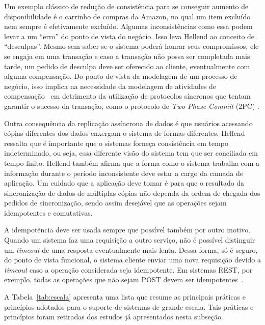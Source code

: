 Um exemplo clássico de redução de consistência para se conseguir aumento de disponibilidade é o carrinho de compras da Amazon, no qual um item excluído nem sempre é efetivamente excluído. Algumas inconsistências como essa podem levar a um ``erro'' do ponto de vista do negócio. Isso leva Hellend ao conceito de ``desculpas''. Mesmo sem saber se o sistema poderá honrar seus compromissos, ele se engaja em uma transação e caso a transação não possa ser completada mais tarde, um pedido de desculpa deve ser oferecido ao cliente, eventualmente com alguma compensação. Do ponto de vista da modelagem de um processo de negócio, isso implica na necessidade da modelagem de atividades de compensação~\cite{Garcia1991Saga} em detrimento da utilização de protocolos síncronos que tentam garantir o sucesso da transação, como o protocolo de \textit{Two Phase Commit} (2PC) \cite{Bernstein20092PC}.

Outra consequência da replicação assíncrona de dados é que usuários acessando cópias diferentes dos dados enxergam o sistema de formas diferentes. Hellend ressalta que é importante que o sistemas forneça consistência em tempo indeterminado, ou seja, essa diferente visão do sistema tem que ser conciliada em tempo finito. Hellend também afirma que a forma como o sistema trabalha com a informação durante o período inconsistente deve estar a cargo da camada de aplicação. Um cuidado que a aplicação deve tomar é para que o resultado da sincronização de dados de múltiplas cópias não dependa da ordem de chegada dos pedidos de sincronização, sendo assim desejável que as operações sejam idempotentes e comutativas. 

A idempotência deve ser usada sempre que possível também por outro motivo. Quando um sistema faz uma requisição a outro serviço, não é possível distinguir um \emph{timeout} de uma resposta eventualmente mais lenta. Dessa forma, só é seguro, do ponto de vista funcional, o sistema cliente enviar uma nova requisição devido a \emph{timeout} caso a operação considerada seja idempotente. Em sistemas REST, por exemplo, todas as operações que não sejam POST devem ser idempotentes~\cite{Allamaraju2010REST}.

A Tabela~\ref{tab:escala} apresenta uma lista que resume as principais práticas e princípios adotados para o suporte de sistemas de grande escala. Tais práticas e princípios foram retiradas dos estudos já apresentados nesta subseção.

